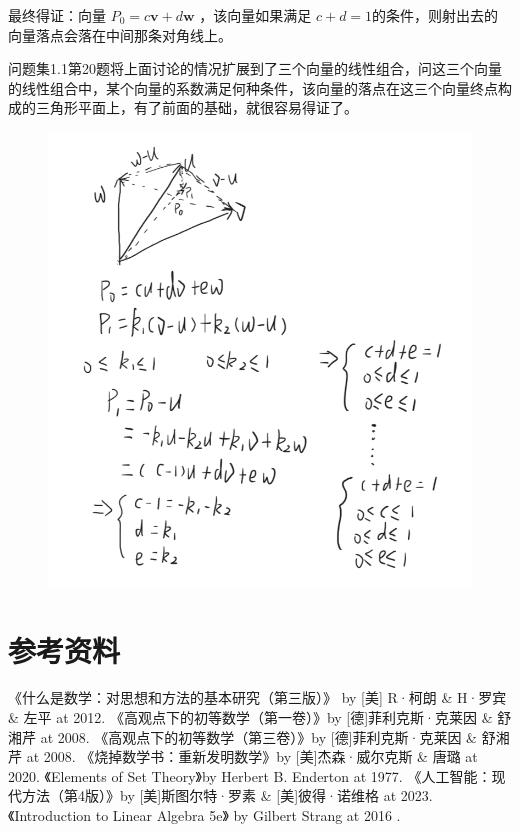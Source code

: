 \documentclass[12pt,oneside]{book}
\begin{document}
最终得证：向量 $P_0 = c\boldsymbol{v}+d\boldsymbol{w}$ ，该向量如果满足 $c+d=1$的条件，则射出去的向量落点会落在中间那条对角线上。


\cite{线性代数引论}问题集1.1第20题将上面讨论的情况扩展到了三个向量的线性组合，问这三个向量的线性组合中，某个向量的系数满足何种条件，该向量的落点在这三个向量终点构成的三角形平面上，有了前面的基础，就很容易得证了。


\begin{figure}[H]
\centering
\includegraphics[width=\linewidth ,totalheight=0.95\textheight , keepaspectratio]{线性代数引论问题集1_1_20.png}
\end{figure}



\backmatter
\part*{参考资料}
\begin{thebibliography}{99}
 《什么是数学：对思想和方法的基本研究（第三版）》 by [美] R·柯朗 \& H·罗宾 \&  左平  at 2012.
 《高观点下的初等数学（第一卷）》by [德]菲利克斯·克莱因 \& 舒湘芹 at 2008.
 《高观点下的初等数学（第三卷）》by [德]菲利克斯·克莱因 \& 舒湘芹 at 2008.
 《烧掉数学书：重新发明数学》by [美]杰森·威尔克斯 \& 唐璐 at 2020.
 《Elements of Set Theory》by Herbert B. Enderton at 1977.
 《人工智能：现代方法（第4版）》by [美]斯图尔特·罗素 \& [美]彼得·诺维格 at 2023.
 《Introduction to Linear Algebra 5e》 by Gilbert Strang at 2016 .
\end{thebibliography}
\end{document}
